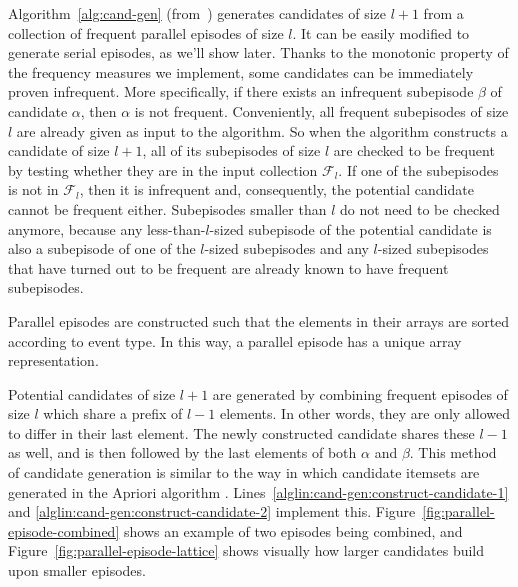 Algorithm~\ref{alg:cand-gen} (from~\citep{mannila1997discovery}) generates candidates of size $ l + 1 $ from a collection of frequent parallel episodes of size $ l $. It can be easily modified to generate serial episodes, as we'll show later. Thanks to the monotonic property of the frequency measures we implement, some candidates can be immediately proven infrequent. More specifically, if there exists an infrequent subepisode $ \beta $ of candidate $ \alpha $, then $ \alpha $ is not frequent.
Conveniently, all frequent subepisodes of size $ l $ are already given as input to the algorithm. So when the algorithm constructs a candidate of size $ l + 1 $, all of its subepisodes of size $ l $ are checked to be frequent by testing whether they are in the input collection $ \mathcal{F}_l $. If one of the subepisodes is not in $ \mathcal{F}_l $, then it is infrequent and, consequently, the potential candidate cannot be frequent either.
Subepisodes smaller than $ l $ do not need to be checked anymore, because any less-than-$ l $-sized subepisode of the potential candidate is also a subepisode of one of the $ l $-sized subepisodes and any $ l $-sized subepisodes that have turned out to be frequent are already known to have frequent subepisodes.

Parallel episodes are constructed such that the elements in their arrays are sorted according to event type. In this way, a parallel episode has a unique array representation.

Potential candidates of size $ l + 1 $ are generated by combining frequent episodes of size $ l $ which share a prefix of $ l - 1 $ elements. In other words, they are only allowed to differ in their last element. The newly constructed candidate shares these $ l - 1 $ as well, and is then followed by the last elements of both $ \alpha $ and $ \beta $. This method of candidate generation is similar to the way in which candidate itemsets are generated in the Apriori algorithm \citep{mannila1997discovery}. Lines~\ref{alglin:cand-gen:construct-candidate-1} and \ref{alglin:cand-gen:construct-candidate-2} implement this. Figure~\ref{fig:parallel-episode-combined} shows an example of two episodes being combined, and Figure~\ref{fig:parallel-episode-lattice} shows visually how larger candidates build upon smaller episodes.

